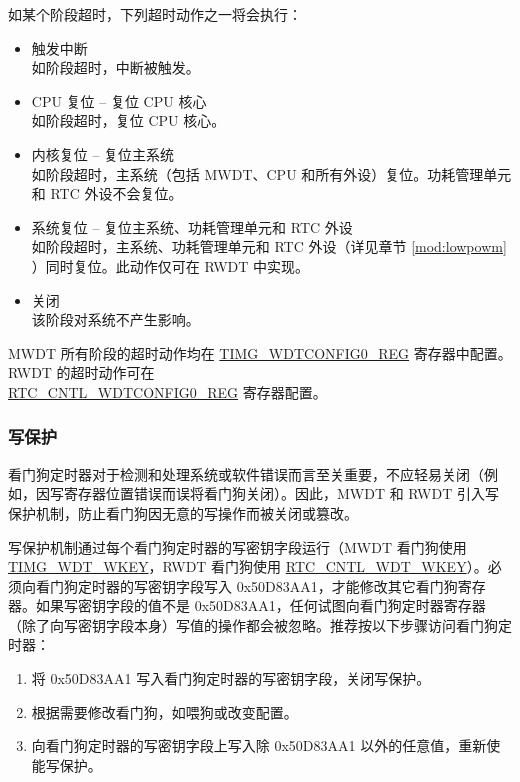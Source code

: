 \documentclass[main\_\_CN.tex]{subfiles}
\begin{document}
如某个阶段超时，下列超时动作之一将会执行：
\begin{itemize}
    \item 触发中断\\
    如阶段超时，中断被触发。
    \item CPU 复位 -- 复位 CPU 核心\\
    如阶段超时，复位 CPU 核心。
    \item 内核复位 -- 复位主系统\\
    如阶段超时，主系统（包括 MWDT、CPU 和所有外设）复位。功耗管理单元和 RTC 外设不会复位。
    \item 系统复位 -- 复位主系统、功耗管理单元和 RTC 外设\\
    如阶段超时，主系统、功耗管理单元和 RTC 外设（详见章节 \ref{mod:lowpowm} \textit{}）同时复位。此动作仅可在 RWDT 中实现。
    \item 关闭\\
    该阶段对系统不产生影响。
\end{itemize}

MWDT 所有阶段的超时动作均在 \hyperref[regdesc:TIMGWDTCONFIG0REG]{TIMG\_WDTCONFIG0\_REG} 寄存器中配置。RWDT 的超时动作可在\\ \hyperref[regdesc:RTCCNTLWDTCONFIG0REG]{RTC\_CNTL\_WDTCONFIG0\_REG} 寄存器配置。

\subsubsection{写保护}
看门狗定时器对于检测和处理系统或软件错误而言至关重要，不应轻易关闭（例如，因写寄存器位置错误而误将看门狗关闭）。因此，MWDT 和 RWDT 引入写保护机制，防止看门狗因无意的写操作而被关闭或篡改。

写保护机制通过每个看门狗定时器的写密钥字段运行（MWDT 看门狗使用 \hyperref[fielddesc:TIMGWDTWKEY]{TIMG\_WDT\_WKEY}，RWDT 看门狗使用 \hyperref[fielddesc:RTCCNTLWDTWKEY]{RTC\_CNTL\_WDT\_WKEY}）。必须向看门狗定时器的写密钥字段写入 0x50D83AA1，才能修改其它看门狗寄存器。如果写密钥字段的值不是 0x50D83AA1，任何试图向看门狗定时器寄存器（除了向写密钥字段本身）写值的操作都会被忽略。推荐按以下步骤访问看门狗定时器：

\begin{enumerate}
\item 将 0x50D83AA1 写入看门狗定时器的写密钥字段，关闭写保护。
\item 根据需要修改看门狗，如喂狗或改变配置。
\item 向看门狗定时器的写密钥字段上写入除 0x50D83AA1 以外的任意值，重新使能写保护。
\end{enumerate}
\end{document}
